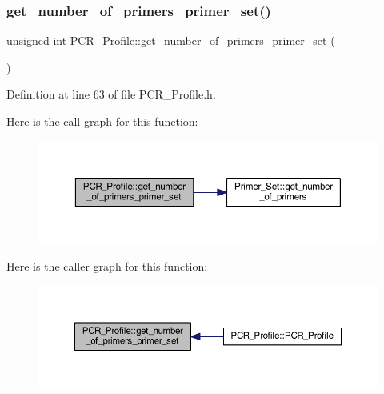 \subsubsection{\texorpdfstring{get\+\_\+number\+\_\+of\+\_\+primers\+\_\+primer\+\_\+set()}{get\_number\_of\_primers\_primer\_set()}}
{\footnotesize\ttfamily unsigned int P\+C\+R\+\_\+\+Profile\+::get\+\_\+number\+\_\+of\+\_\+primers\+\_\+primer\+\_\+set (\begin{DoxyParamCaption}{ }\end{DoxyParamCaption})\hspace{0.3cm}{\ttfamily [inline]}}



Definition at line 63 of file P\+C\+R\+\_\+\+Profile.\+h.

Here is the call graph for this function\+:
\nopagebreak
\begin{figure}[H]
\begin{center}
\leavevmode
\includegraphics[width=350pt]{class_p_c_r___profile_a3adc7245807935d0d10c7600593254a2_cgraph}
\end{center}
\end{figure}
Here is the caller graph for this function\+:
\nopagebreak
\begin{figure}[H]
\begin{center}
\leavevmode
\includegraphics[width=350pt]{class_p_c_r___profile_a3adc7245807935d0d10c7600593254a2_icgraph}
\end{center}
\end{figure}
\mbox{\label{class_p_c_r___profile_a5470c4248e9c347b66ee1ad977d2a6f9}} 
